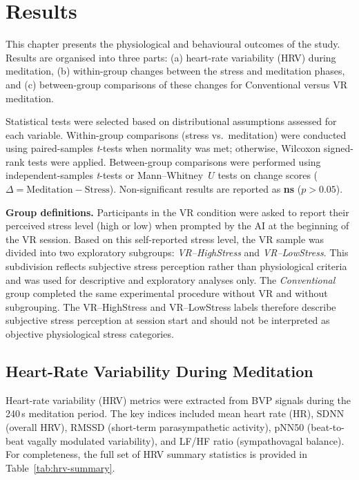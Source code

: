 \chapter{Results}
\label{chap:results}

This chapter presents the physiological and behavioural outcomes of the study.
Results are organised into three parts:
(a) heart-rate variability (HRV) during meditation,
(b) within-group changes between the stress and meditation phases, and
(c) between-group comparisons of these changes for Conventional versus VR meditation.

Statistical tests were selected based on distributional assumptions assessed for
each variable. Within-group comparisons (stress vs.\ meditation) were conducted
using paired-samples \textit{t}-tests when normality was met; otherwise, Wilcoxon
signed-rank tests were applied. Between-group comparisons were performed using
independent-samples \textit{t}-tests or Mann--Whitney~$U$ tests on change scores
($\Delta = \text{Meditation} - \text{Stress}$). Non-significant results are reported
as \textbf{ns} ($p > 0.05$).

\noindent\textbf{Group definitions.}
Participants in the VR condition were asked to report their perceived stress level
(high or low) when prompted by the AI at the beginning of the VR session.
Based on this self-reported stress level, the VR sample was divided into two
exploratory subgroups: \textit{VR--HighStress} and \textit{VR--LowStress}.
This subdivision reflects subjective stress perception rather than physiological
criteria and was used for descriptive and exploratory analyses only.
The \textit{Conventional} group completed the same experimental procedure
without VR and without subgrouping. The VR–HighStress and VR–LowStress labels therefore describe subjective stress perception at session start and should not be interpreted as objective physiological stress categories.


\section{Heart-Rate Variability During Meditation}
\label{sec:results_hrv}

Heart-rate variability (HRV) metrics were extracted from BVP signals during the 240\,s
meditation period.
The key indices included mean heart rate (HR), SDNN (overall HRV), RMSSD (short-term parasympathetic
activity), pNN50 (beat-to-beat vagally modulated variability), and LF/HF ratio (sympathovagal balance). For completeness, the full set of HRV summary statistics is provided in Table~\ref{tab:hrv-summary}.

